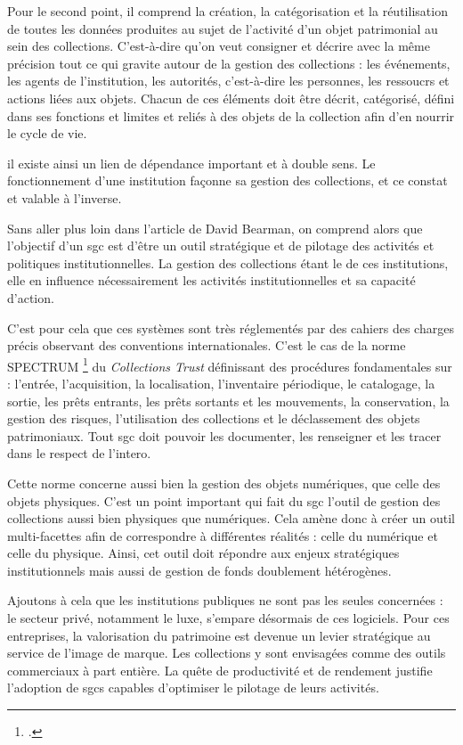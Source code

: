 Pour le second point, il comprend la création, la catégorisation et la réutilisation de toutes les données produites au sujet de l'activité d'un objet patrimonial au sein des collections. C'est-à-dire qu'on veut consigner et décrire avec la même précision tout ce qui gravite autour de la gestion des collections : les événements, les agents de l'institution, les autorités, c'est-à-dire les personnes, les ressoucrs et actions liées aux objets. Chacun de ces éléments doit être décrit, catégorisé, défini dans ses fonctions et limites et reliés à des objets de la collection afin d'en nourrir le cycle de vie. 

il existe ainsi un lien de dépendance important et à double sens. Le fonctionnement d'une institution façonne sa gestion des collections, et ce constat et valable à l'inverse.\newline

Sans aller plus loin dans l'article de David Bearman, on comprend alors que l'objectif d'un \gls{sgc} est d'être un outil stratégique et de pilotage des activités et politiques institutionnelles. La gestion des collections étant le \coeur de ces institutions, elle en influence nécessairement les activités institutionnelles et sa capacité d'action.

C'est pour cela que ces systèmes sont très réglementés par des cahiers des charges précis observant des conventions internationales. C'est le cas de la norme SPECTRUM \footcite{Spectrum} du \textit{Collections Trust} définissant des procédures fondamentales sur : l'entrée, l'acquisition, la localisation, l'inventaire périodique, le catalogage, la sortie, les prêts entrants, les prêts sortants et les mouvements, la conservation, la gestion des risques, l'utilisation des collections et le déclassement des objets patrimoniaux. Tout \gls{sgc} doit pouvoir les documenter, les renseigner et les tracer dans le respect de l'\gls{intero}. 

Cette norme concerne aussi bien la gestion des objets numériques, que celle des objets physiques. C'est un point important qui fait du \gls{sgc} l'outil de gestion des collections aussi bien physiques que numériques. Cela amène donc à créer un outil multi-facettes afin de correspondre à différentes réalités : celle du numérique et celle du physique. Ainsi, cet outil doit répondre aux enjeux stratégiques institutionnels mais aussi de gestion de fonds doublement hétérogènes.\newline

Ajoutons à cela que les institutions publiques ne sont pas les seules concernées : le secteur privé, notamment le luxe, s'empare désormais de ces logiciels. Pour ces entreprises, la valorisation du patrimoine est devenue un levier stratégique au service de l'image de marque. Les collections y sont envisagées comme des outils commerciaux à part entière. La quête de productivité et de rendement justifie l'adoption de \glspl{sgc} capables d'optimiser le pilotage de leurs activités.\newline

